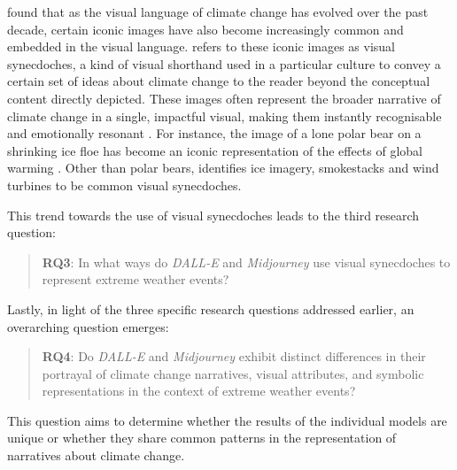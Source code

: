 \textcite[16]{ONeill2019} found that as the visual language of climate change has evolved over the past decade, certain iconic images have also become increasingly common and embedded in the visual language. \textcite[17]{ONeill2019} refers to these iconic images as visual synecdoches, a kind of visual shorthand used in a particular culture to convey a certain set of ideas about climate change  to the reader beyond the conceptual content directly depicted. These images often represent the broader narrative of climate change in a single, impactful visual, making them instantly recognisable and emotionally resonant \parencite[78]{ONeill2014}. For instance, the image of a lone polar bear on a shrinking ice floe has become an iconic representation of the effects of global warming \parencite[18]{ONeill2019}. Other than polar bears, \textcite[16]{ONeill2019} identifies ice imagery, smokestacks and wind turbines to be common visual synecdoches.

This trend towards the use of visual synecdoches leads to the third research question:
 \begin{quote}
\textbf{RQ3}: In what ways do \textit{DALL-E} and \textit{Midjourney} use visual synecdoches to represent extreme weather events?

 \end{quote}

Lastly, in light of the three specific research questions addressed earlier, an overarching question emerges:

\begin{quote}
\textbf{RQ4}: Do \textit{DALL-E} and \textit{Midjourney} exhibit distinct differences in their portrayal of climate change narratives, visual attributes, and symbolic representations in the context of extreme weather events?
\end{quote}

This question aims to determine whether the results of the individual models are unique or whether they share common patterns in the representation of narratives about climate change.





